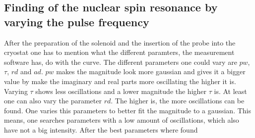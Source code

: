     \subsection{Finding of the nuclear spin resonance by varying the pulse frequency}
    \label{task_2}
    After the preparation of the solenoid and the insertion of the probe into the cryostat one has to mention what the different paramters, the measurement software has, do with the curve. The different parameters one could vary are $pw$, $\tau$, $rd$ and $ad$. $pw$ makes the magnitude look more gaussian and gives it a bigger value by make the imaginary and real parts more oscillating the higher it is. Varying $\tau$ shows less oscillations and a lower magnitude the higher $\tau$ is. At least one can also vary the parameter $rd$. The higher is, the more oscillations can be found. One varies this parameters to better fit the magnitude to a gaussian. This means, one searches parameters with a low amount of oscillations, which also have not a big intensity. After the best parameters where found

